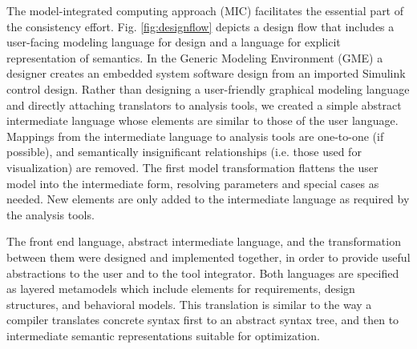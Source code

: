 The model-integrated computing approach (MIC) \cite{mic:overview} facilitates the essential 
part of the consistency effort.  Fig. \ref{fig:designflow} depicts a design flow that includes 
a user-facing modeling language for design and a language for explicit representation of semantics.  
In the Generic Modeling Environment (GME) \cite{mic:gme} a designer creates an embedded system 
software design from an imported Simulink control design.  Rather than designing a user-friendly 
graphical modeling language and directly attaching translators to analysis tools, we created a 
simple abstract intermediate language whose elements are similar to those of the user language. 
Mappings from the intermediate language to analysis tools are one-to-one (if possible), and 
semantically insignificant relationships (i.e. those used for visualization) are removed.  
The first model transformation flattens the user model into the intermediate form, resolving 
parameters and special cases as needed. New elements are only added to the intermediate language 
as required by the analysis tools.

The front end language, abstract intermediate language, and the transformation between them 
were designed and implemented together, in order to provide useful abstractions to the user 
and to the tool integrator.  Both languages are specified as layered metamodels 
\cite{mic:overview} which include elements for requirements, design structures, and behavioral 
models.   This translation is similar to the way a compiler translates concrete syntax first 
to an abstract syntax tree, and then to intermediate semantic representations suitable for optimization.

